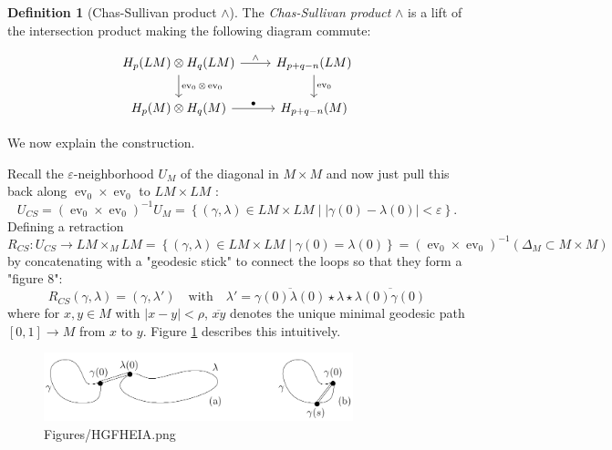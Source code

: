 \documentclass[reqno]{amsart}
\theoremstyle{definition}
\newtheorem{definition}[theorem]{Definition}
\theoremstyle{remark}
\DeclareMathOperator{\ev}{ev}
\begin{document}
\begin{definition}[Chas-Sullivan product $\wedge$]
    The \textit{Chas-Sullivan product} $\wedge$ is a lift
    of the intersection product making the following diagram commute:

    \begin{equation*}
    \begin{tikzcd}
        H_p(LM) \otimes H_q(LM) \ar[d, "\ev_0 \otimes \ev_0"] 
        \ar[r, "\wedge"] & H_{p+q-n}(LM) \ar[d, "\ev_0"] \\
        H_p(M) \otimes H_q(M) \ar[r, "\bullet"] &
        H_{p+q-n}(M)
    \end{tikzcd}
    \end{equation*}
\end{definition}

We now explain the construction.

Recall the $\varepsilon$-neighborhood $U_M$ of the diagonal
in $M \times M$ and now just pull this back along
$\ev_0 \times \ev_0$
 to $LM \times LM$ :
 \[
 U_{CS} = \left( \ev_0 \times \ev_0 \right)^{-1} U_M = 
 \left\{ \left( \gamma, \lambda \right) \in LM \times LM  \mid 
 \left| \gamma(0) - \lambda(0) \right| < \varepsilon \right\} .
 \] 
 Defining a retraction
 \[
 R_{CS} \colon U_{CS} \to LM \times_M LM = 
 \left\{ \left( \gamma, \lambda \right) \in LM \times LM  \mid 
 \gamma(0) = \lambda(0) \right\} = 
 \left( \ev_0 \times \ev_0 \right)^{-1} \left( \Delta_M \subset 
 M \times M \right) 
 \] 
 by concatenating with a "geodesic stick" to connect the loops
 so that they form a "figure 8":
 \[
 R_{CS}\left( \gamma, \lambda \right) = 
 \left( \gamma, \lambda' \right) \quad \text{with} \quad
 \lambda' = \overline{\gamma(0) \lambda(0)} \star \lambda
 \star \overline{\lambda(0) \gamma(0)}
 \] 
 where for $x,y \in M$ with $\left| x-y \right| < \rho$,
 $\overline{xy}$ denotes the unique minimal geodesic path
 $\left[ 0,1 \right] \to M$ from $x$ to $y$.
 Figure \ref{fig:Figures-HGFHEIA-png} describes this intuitively.

 \begin{figure}[htpb]
     \centering
     \includegraphics[width=0.8\textwidth]{Figures/HGFHEIA.png}
     \caption{Figures/HGFHEIA.png}
     \label{fig:Figures-HGFHEIA-png}
 \end{figure}
\end{document}
